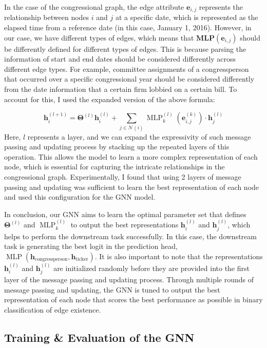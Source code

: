 \documentclass[15pt,letterpaper]{article}
\begin{document}
In the case of the congressional graph, the edge attribute $\mathbf{e}_{i,j}$ represents the relationship between nodes $i$ and $j$ at a specific date, which is represented as the elapsed time from a reference date (in this case, January 1, 2016). 
However, in our case, we have different types of edges, which means that $\mathbf{MLP}\left(\mathbf{e}_{i, j}\right)$ should be differently defined for different types of edges. This is because parsing the information of start and end dates should be considered differently across different edge types. For example, committee assignments of a congressperson that occurred over a specific congressional year should be considered differently from the date information that a certain firm lobbied on a certain bill. To account for this, I used the expanded version of the above formula:

$$\mathbf{h}_i^{(l+1)}=\boldsymbol{\Theta}^{(l)} \mathbf{h}_i^{(l)}+\sum_{j \in \mathcal{N}(i)} \operatorname{MLP}^{(l)}_k\left(\mathbf{e}_{i, j}^{(k)}\right) \cdot \mathbf{h}_j^{(l)}$$
Here, $l$ represents a layer, and we can expand the expressivity of such message passing and updating process by stacking up the repeated layers of this operation. This allows the model to learn a more complex representation of each node, which is essential for capturing the intricate relationships in the congressional graph.
Experimentally, I found that using 2 layers of message passing and updating was sufficient to learn the best representation of each node and used this configuration for the GNN model.

In conclusion, our GNN aims to learn the optimal parameter set that defines $\boldsymbol{\Theta}^{(l)}$ and $\operatorname{MLP}_k^{(l)}$ to output the best representations $\mathbf{h}_i^{(l)}$ and $\mathbf{h}_j^{(l)}$, which helps to perform the downstream task successfully. In this case, the downstream task is generating the best logit in the prediction head, $\operatorname{MLP}(\mathbf{h}_{\text{congressperson}}, \mathbf{h}_{\text{ticker}})$. It is also important to note that the representations $\mathbf{h}_i^{(l)}$ and $\mathbf{h}_j^{(l)}$ are initialized randomly before they are provided into the first layer of the message passing and updating process. Through multiple rounds of message passing and updating, the GNN is tuned to output the best representation of each node that scores the best performance as possible in binary classification of edge existence.

\subsection{Training \& Evaluation of the GNN}
\end{document}
